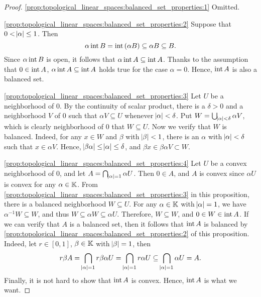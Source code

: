 \begin{proof}
\ref{prop:topological_linear_spaces:balanced_set_properties:1}
Omitted. 

\ref{prop:topological_linear_spaces:balanced_set_properties:2}
Suppose that $0 < \abs{\alpha} \le 1$. 
Then 
\begin{equation*}
    \alpha \operatorname{int}{B} = \operatorname{int}{(\alpha B)} 
    \subseteq \alpha B \subseteq B. 
\end{equation*}
Since $\alpha \operatorname{int}{B}$ is open, it follows that $\alpha \operatorname{int}{A} 
\subseteq \operatorname{int}{A}$. 
Thanks to the assumption that $0 \in \operatorname{int}{A}$, $\alpha \operatorname{int}{A} 
\subseteq \operatorname{int}{A}$ holds true for the case $\alpha = 0$. 
Hence, $\operatorname{int}{A}$ is also a balanced set. 

\ref{prop:topological_linear_spaces:balanced_set_properties:3}
Let $U$ be a neighborhood of $0$. 
By the continuity of scalar product, there is a $\delta > 0$ and a 
neighborhood $V$ of $0$ such that $\alpha V \subseteq U$ whenever 
$\abs{\alpha} < \delta$. 
Put $W = \bigcup_{\abs{\alpha} < \delta} \alpha V$, which is clearly 
neighborhood of $0$ that $W \subseteq U$. 
Now we verify that $W$ is balanced. 
Indeed, for any $x \in W$ and $\beta$ with $\abs{\beta} < 1$, there is an 
$\alpha$ with $\abs{\alpha} < \delta$ such that $x \in \alpha V$. 
Hence, $\abs{\beta \alpha} \le \abs{\alpha} \le \delta$, and $\beta x 
\in \beta \alpha V \subset W$. 

\ref{prop:topological_linear_spaces:balanced_set_properties:4}
Let $U$ be a convex neighborhood of $0$, and let $A = \bigcap_
{\abs{\alpha} = 1} \alpha U$. 
Then $0 \in A$, and $A$ is convex since $\alpha U$ is convex for any 
$\alpha \in \mathbb{K}$. 
From \ref{prop:topological_linear_spaces:balanced_set_properties:3} in this 
proposition, there is a balanced neighborhood $W \subseteq U$. 
For any $\alpha \in \mathbb{K}$ with $\abs{\alpha} = 1$, we have $\alpha^{-1} W 
\subseteq W$, and thus $W \subseteq \alpha W \subseteq \alpha U$. 
Therefore, $W \subseteq W$, and $0 \in W \in \operatorname{int}{A}$. 
If we can verify that $A$ is a balanced set, then it follows that 
$\operatorname{int}{A}$ is balanced by \ref{prop:topological_linear_spaces:balanced_set_properties:2}
of this proposition. 
Indeed, let $r \in [0, 1]$, $\beta \in \mathbb{K}$ with $\abs{\beta} = 1$, then 
\begin{equation*}
    \begin{aligned}
        r\beta A = \bigcap_{\abs{\alpha} = 1} r \beta \alpha U 
        = \bigcap_{\abs{\alpha} = 1} r \alpha U 
        \subseteq \bigcap_{\abs{\alpha} = 1} \alpha U 
        = A. 
    \end{aligned}
\end{equation*}
Finally, it is not hard to show that $\operatorname{int}{A}$ is convex. 
Hence, $\operatorname{int}{A}$ is what we want. 
\end{proof}

